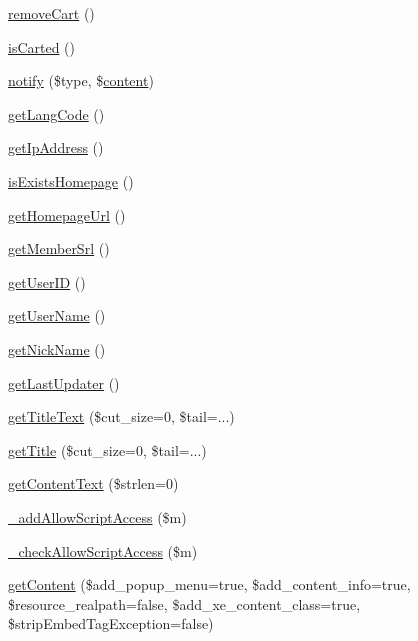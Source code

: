 \begin{DoxyCompactItemize}
\item 
\hyperlink{classdocumentItem_aa66932772c39aeff91238badd8246969}{remove\+Cart} ()
\item 
\hyperlink{classdocumentItem_a505c87502da3ca4b656230125ffa4f1e}{is\+Carted} ()
\item 
\hyperlink{classdocumentItem_afbccc4d35ce638fac62221e5602cc750}{notify} (\$type, \$\hyperlink{classcontent}{content})
\item 
\hyperlink{classdocumentItem_a7491640a855ace286820cb11f273ddb6}{get\+Lang\+Code} ()
\item 
\hyperlink{classdocumentItem_ac0e9b0006f067bc0918751148606d325}{get\+Ip\+Address} ()
\item 
\hyperlink{classdocumentItem_a7cc882ce0da6cbe675be8fdb980a0d97}{is\+Exists\+Homepage} ()
\item 
\hyperlink{classdocumentItem_ab9117599bb123e83289d2a24fd44bf50}{get\+Homepage\+Url} ()
\item 
\hyperlink{classdocumentItem_a75af5f05bd55c32bdc6c17dd8511e4e8}{get\+Member\+Srl} ()
\item 
\hyperlink{classdocumentItem_a66a8157a3cc7c82325eadcefe6390a58}{get\+User\+ID} ()
\item 
\hyperlink{classdocumentItem_a072696b683278c84bc3ebfee46d4216f}{get\+User\+Name} ()
\item 
\hyperlink{classdocumentItem_ab91ca9e1defb1a570212baa4f380706a}{get\+Nick\+Name} ()
\item 
\hyperlink{classdocumentItem_a784effc9e694d82da32e06e95482ff28}{get\+Last\+Updater} ()
\item 
\hyperlink{classdocumentItem_aad953dc30cf01a1d451cb90c66c09b0c}{get\+Title\+Text} (\$cut\+\_\+size=0, \$tail=\textquotesingle{}...\textquotesingle{})
\item 
\hyperlink{classdocumentItem_a365509266cc36e56b66df824bc2fcbfc}{get\+Title} (\$cut\+\_\+size=0, \$tail=\textquotesingle{}...\textquotesingle{})
\item 
\hyperlink{classdocumentItem_acdef9404e1dc50d82456fb112212e23e}{get\+Content\+Text} (\$strlen=0)
\item 
\hyperlink{classdocumentItem_a6bc6bbe65e83e9bfc03bae1fea5b75d7}{\+\_\+add\+Allow\+Script\+Access} (\$m)
\item 
\hyperlink{classdocumentItem_a0d88d945333c887802ad1f8442f5d5c7}{\+\_\+check\+Allow\+Script\+Access} (\$m)
\item 
\hyperlink{classdocumentItem_ab93870c122bc952a206f3c64ced3aa9e}{get\+Content} (\$add\+\_\+popup\+\_\+menu=true, \$add\+\_\+content\+\_\+info=true, \$resource\+\_\+realpath=false, \$add\+\_\+xe\+\_\+content\+\_\+class=true, \$strip\+Embed\+Tag\+Exception=false)

\end{DoxyCompactItemize}
